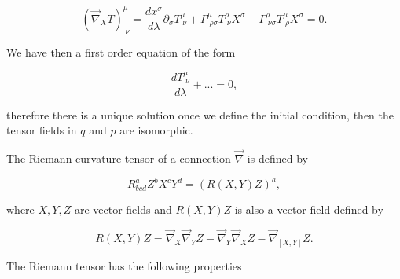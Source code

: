             \begin{equation}
                \left(\Vec{\nabla}_XT\right)^{\mu}_{\;\nu} = \frac{dx^{\sigma}}{d\lambda}\partial_{\sigma}T^{\mu}_{\;\nu} + \Gamma^{\mu}_{\;\rho\sigma}T^{\rho}_{\;\nu}X^{\sigma} - \Gamma^{\rho}_{\;\nu\sigma}T^{\mu}_{\;\rho}X^{\sigma}=0.
            \end{equation}

            We have then a first order equation of the form

            \begin{equation}
                \frac{d T^{\mu}_{\;\nu}}{d\lambda}+... = 0,
            \end{equation}

            therefore there is a unique solution once we define the initial condition, then the tensor fields in $q$ and $p$ are isomorphic.

            \begin{myDef}
                The Riemann curvature tensor of a connection $\Vec{\nabla}$ is defined by

                \begin{equation}
                    R^a_{bcd}Z^bX^cY^d = \left(R\left(X,Y\right) Z\right)^a,
                \end{equation}

                where $X,Y,Z$ are vector fields and $R\left(X,Y\right)Z$ is also a vector field defined by

                \begin{equation}
                    R\left(X,Y\right)Z = \Vec{\nabla}_X\Vec{\nabla}_YZ - \Vec{\nabla}_Y\Vec{\nabla}_XZ - \Vec{\nabla}_{[X,Y]}Z.
                \end{equation}
            \end{myDef}

            The Riemann tensor has the following properties

